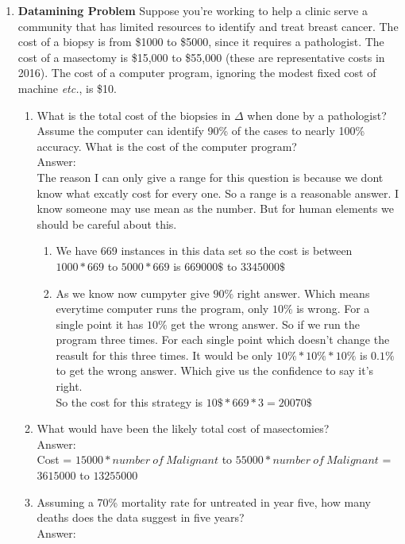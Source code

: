\documentclass{article}
\begin{document}
\begin{enumerate}\item  {\bf Datamining Problem} Suppose you're working to help a clinic serve a community that has limited resources to identify and treat breast cancer.  The cost of a biopsy is from \$1000 to \$5000, since it requires a pathologist.  The cost of a masectomy is \$15,000 to \$55,000 (these are representative costs in 2016).   The cost of a computer program, ignoring the modest fixed cost of machine {\it etc.}, is \$10.

 \begin{enumerate} \item What is the total cost of the biopsies in $\Delta$ when done by a pathologist?  Assume the computer can identify 90\% of the cases to nearly 100\% accuracy.  What is the cost of the computer program? \\
 	Answer:\\
 	The reason I can only give a range for this question is because we dont know what excatly cost for every one. So a range is a reasonable answer. I know someone may use mean as the number. But for human elements we should be careful about this.
 	\begin{enumerate}
 		\item We have 669 instances in this data set so the cost is between $1000 * 669$ to $5000 * 669$ is $669000\$$ to $3345000\$$  
 		\item As we know now cumpyter give $90\%$ right answer. Which means everytime computer runs the program, only $10\%$ is wrong. For a single point it has $10\%$ get the wrong answer. So if we run the program three times. For each single  point which doesn't change the reasult for this three times. It would be only $10\% * 10\% * 10\%$ is $0.1\%$ to get the wrong answer. Which give us the confidence to say it's right.\\
 		So the cost for this strategy is $10\$ * 669 * 3 = 20070\$$
 	\end{enumerate}
 	\item What would have been the likely total cost of masectomies?\\
 	Answer:\\
 	Cost = $15000 * number\ of\ Malignant $ to $55000 * number\ of\ Malignant $ = $3615000$ to $13255000$
 	 \item Assuming a 70\% mortality rate for untreated in year five, how many deaths does the data suggest in five years? \\
 	 Answer:\\

\end{enumerate}
\end{enumerate}
\end{document}
